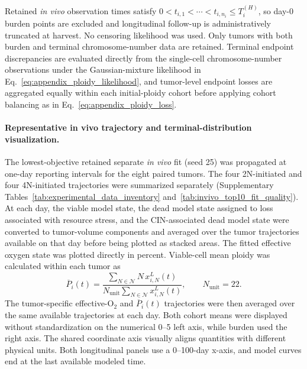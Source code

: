 \documentclass[11pt]{article}
\begin{document}
Retained \textit{in vivo} observation times satisfy $0<t_{i,1}<\cdots<t_{i,n_i}\le T_i^{(H)}$, so day-0 burden points are excluded and longitudinal follow-up is administratively truncated at harvest. No censoring likelihood was used. Only tumors with both burden and terminal chromosome-number data are retained. Terminal endpoint discrepancies are evaluated directly from the single-cell chromosome-number observations under the Gaussian-mixture likelihood in Eq.~\eqref{eq:appendix_ploidy_likelihood}, and tumor-level endpoint losses are aggregated equally within each initial-ploidy cohort before applying cohort balancing as in Eq.~\eqref{eq:appendix_ploidy_loss}.

\paragraph{Representative in vivo trajectory and terminal-distribution visualization.}
The lowest-objective retained separate \textit{in vivo} fit (seed 25) was propagated at one-day reporting intervals for the eight paired tumors. The four 2N-initiated and four 4N-initiated trajectories were summarized separately (Supplementary Tables~\ref{tab:experimental_data_inventory} and~\ref{tab:invivo_top10_fit_quality}). At each day, the viable model state, the dead model state assigned to loss associated with resource stress, and the CIN-associated dead model state were converted to tumor-volume components and averaged over the tumor trajectories available on that day before being plotted as stacked areas. The fitted effective oxygen state was plotted directly in percent. Viable-cell mean ploidy was calculated within each tumor as
\begin{equation}
\overline{P}_i(t)=
\frac{\sum_{N\in\mathcal N}N\,x^L_{i,N}(t)}
{N_{\mathrm{unit}}\sum_{N\in\mathcal N}x^L_{i,N}(t)},
\qquad N_{\mathrm{unit}}=22.
\label{eq:appendix_invivo_mean_ploidy_display}
\end{equation}
The tumor-specific effective-O$_2$ and \(\overline{P}_i(t)\) trajectories were then averaged over the same available trajectories at each day. Both cohort means were displayed without standardization on the numerical 0--5 left axis, while burden used the right axis. The shared coordinate axis visually aligns quantities with different physical units. Both longitudinal panels use a 0--100-day x-axis, and model curves end at the last available modeled time.
\end{document}
